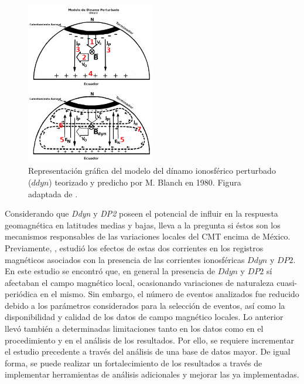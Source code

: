 \begin{figure}
	\centering
	\includegraphics[width=0.5\textwidth]{Images/ddyn_diagedited.png}
	\caption{Representación gráfica del modelo del dínamo ionosférico perturbado ($ddyn$) teorizado y predicho por M. Blanch en 1980. Figura adaptada de \cite{diagrama_ddyn}.}
	\label{fig:ddyn_diag}
\end{figure}

Considerando que \emph{Ddyn} y \emph{DP2} poseen el potencial de influir en la respuesta geomagnética en latitudes medias y bajas, lleva a la pregunta si éstos son los mecanismos responsables de las variaciones locales del CMT encima de México. Previamente, \cite{tesis_yo}, estudió los efectos de estas dos corrientes en los registros magnéticos asociados con la presencia de las corrientes ionosféricas $Ddyn$ y $DP2$. En este estudio se encontró que, en general la presencia de $Ddyn$ y $DP2$ sí afectaban el campo magnético local, ocasionando variaciones de naturaleza cuasi-periódica en el mismo. Sin embargo, el número de eventos analizados fue reducido debido a los parámetros considerados para la selección de eventos, así como la disponibilidad y calidad de los datos de campo magnético locales. Lo anterior llevó también a determinadas limitaciones tanto en los datos como en el procedimiento y en el análisis de los resultados. Por ello, se requiere incrementar el estudio precedente a través del análisis de una base de datos mayor. De igual forma, se puede realizar un fortalecimiento de los resultados a través de implementar herramientas de análisis adicionales y mejorar las ya implementadas.







